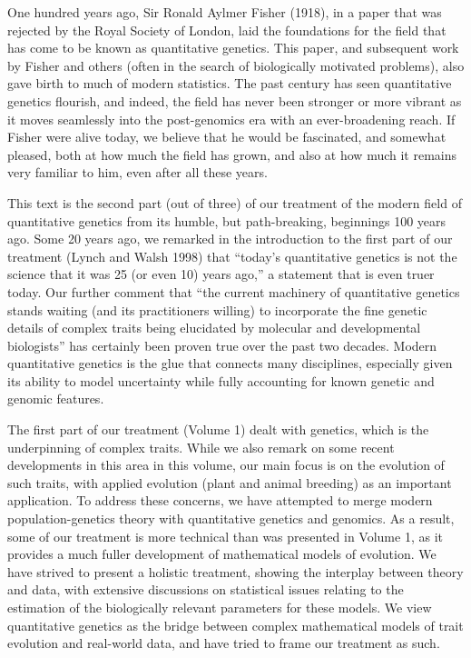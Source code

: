 \documentclass{article}
\begin{document}
One hundred years ago, Sir Ronald Aylmer Fisher (1918), in a paper that was rejected by the Royal Society of London, laid the foundations for the field that has come to be known as quantitative genetics. This paper, and subsequent work by Fisher and others (often in the search of biologically motivated problems), also gave birth to much of modern statistics. The past century has seen quantitative genetics flourish, and indeed, the field has never been stronger or more vibrant as it moves seamlessly into the post-genomics era with an ever-broadening reach. If Fisher were alive today, we believe that he would be fascinated, and somewhat pleased, both at how much the field has grown, and also at how much it remains very familiar to him, even after all these years.

This text is the second part (out of three) of our treatment of the modern field of quantitative genetics from its humble, but path-breaking, beginnings 100 years ago. Some 20 years ago, we remarked in the introduction to the first part of our treatment (Lynch and Walsh 1998) that “today’s quantitative genetics is not the science that it was 25 (or even 10) years ago,” a statement that is even truer today. Our further comment that “the current machinery of quantitative genetics stands waiting (and its practitioners willing) to incorporate the fine genetic details of complex traits being elucidated by molecular and developmental biologists” has certainly been proven true over the past two decades. Modern quantitative genetics is the glue that connects many disciplines, especially given its ability to model uncertainty while fully accounting for known genetic and genomic features.

The first part of our treatment (Volume 1) dealt with genetics, which is the underpinning of complex traits. While we also remark on some recent developments in this area in this volume, our main focus is on the evolution of such traits, with applied evolution (plant and animal breeding) as an important application. To address these concerns, we have attempted to merge modern population-genetics theory with quantitative genetics and genomics. As a result, some of our treatment is more technical than was presented in Volume 1, as it provides a much fuller development of mathematical models of evolution. We have strived to present a holistic treatment, showing the interplay between theory and data, with extensive discussions on statistical issues relating to the estimation of the biologically relevant parameters for these models. We view quantitative genetics as the bridge between complex mathematical models of trait evolution and real-world data, and have tried to frame our treatment as such.
\end{document}
